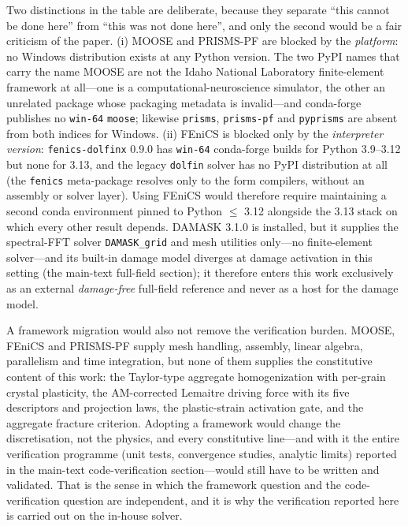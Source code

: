 \documentclass[11pt,a4paper,twocolumn]{article}
\begin{document}
Two distinctions in the table are deliberate, because they separate ``this cannot be done here'' from
``this was not done here'', and only the second would be a fair criticism of the paper. (i) MOOSE and
PRISMS-PF are blocked by the \emph{platform}: no Windows distribution exists at any Python version. The
two PyPI names that carry the name MOOSE are not the Idaho National Laboratory finite-element framework
at all---one is a computational-neuroscience simulator, the other an unrelated package whose packaging
metadata is invalid---and conda-forge publishes no \texttt{win-64} \texttt{moose}; likewise
\texttt{prisms}, \texttt{prisms-pf} and \texttt{pyprisms} are absent from both indices for Windows.
(ii) FEniCS is blocked only by the \emph{interpreter version}: \texttt{fenics-dolfinx} 0.9.0 has
\texttt{win-64} conda-forge builds for Python 3.9--3.12 but none for 3.13, and the legacy \texttt{dolfin}
solver has no PyPI distribution at all (the \texttt{fenics} meta-package resolves only to the form
compilers, without an assembly or solver layer). Using FEniCS would therefore require maintaining a
second conda environment pinned to Python $\le$ 3.12 alongside the 3.13 stack on which every other
result depends. DAMASK 3.1.0 is installed, but it supplies the spectral-FFT solver \texttt{DAMASK\_grid}
and mesh utilities only---no finite-element solver---and its built-in damage model diverges at damage
activation in this setting (the main-text full-field section); it therefore enters this work
exclusively as an external \emph{damage-free} full-field reference and never as a host for the damage
model.

A framework migration would also not remove the verification burden. MOOSE, FEniCS and PRISMS-PF supply
mesh handling, assembly, linear algebra, parallelism and time integration, but none of them supplies the
constitutive content of this work: the Taylor-type aggregate homogenization with per-grain crystal
plasticity, the AM-corrected Lemaitre driving force with its five descriptors and projection laws, the
plastic-strain activation gate, and the aggregate fracture criterion. Adopting a framework would change
the discretisation, not the physics, and every constitutive line---and with it the entire verification
programme (unit tests, convergence studies, analytic limits) reported in the main-text code-verification
section---would still have to be written and validated. That is the sense in which the framework question
and the code-verification question are independent, and it is why the verification reported here is
carried out on the in-house solver.
\end{document}
